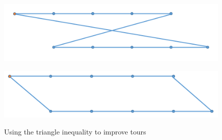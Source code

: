 \begin{figure}
\centering
\begin{minipage}{.5\textwidth}
  \centering
  \includegraphics[width=.48\linewidth]{Chapters/MultiAgentCoverage/Figs/crossingSegments.PNG}
  \label{fig:crossingTour}
\end{minipage}%
\begin{minipage}{.5\textwidth}
  \centering
  \includegraphics[width=.48\linewidth]{Chapters/MultiAgentCoverage/Figs/nonCrossingSegments.png}
  \label{fig:nonCrossingTour}
\end{minipage}
\caption{Using the triangle inequality to improve tours}
\label{fig:fixingTourCrossing}
\end{figure}
























